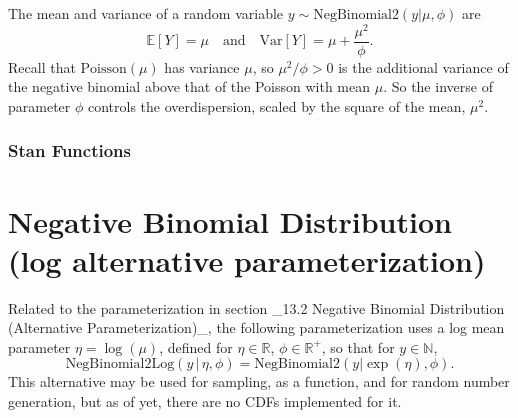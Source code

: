 \begin{description}
The mean and variance of a random variable $y \sim \text{NegBinomial2}(y|\mu,\phi)$ are \[ \mathbb{E}[Y] = \mu \ \ \ \text{ and } \ \ \ \text{Var}[Y] = \mu + \frac{\mu^2}{\phi}. \] Recall that $\text{Poisson}(\mu)$ has variance $\mu$, so $\mu^2 / \phi > 0$ is the additional variance of the negative binomial above that of the Poisson with mean $\mu$.  So the inverse of parameter $\phi$ controls the overdispersion, scaled by the square of the mean, $\mu^2$.




\subsubsection{Stan Functions}


\begin{description}           \end{description}


\section{Negative Binomial Distribution (log alternative parameterization)}\label{neg-binom-2-log.section}


Related to the parameterization in section _13.2 Negative Binomial Distribution (Alternative Parameterization)_, the following parameterization uses a log mean parameter $\eta = \log(\mu)$, defined for $\eta \in \mathbb{R}$, $\phi \in \mathbb{R}^+$, so that for $y \in \mathbb{N}$, \[ \text{NegBinomial2Log}(y \, | \, \eta, \phi) = \text{NegBinomial2}(y | \exp(\eta), \phi). \] This alternative may be used for sampling, as a function, and for random number generation, but as of yet, there are no CDFs implemented for it.



\end{description}
